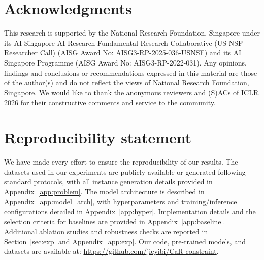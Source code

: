 \documentclass{article} %
\begin{document}
\section*{Acknowledgments}
This research is supported by the National Research Foundation, Singapore under its AI Singapore AI Research Fundamental Research Collaborative (US-NSF Researcher Call) (AISG Award No: AISG3-RP-2025-036-USNSF) and its AI Singapore Programme (AISG Award No: AISG3-RP-2022-031). Any opinions, findings and conclusions or recommendations expressed in this material are those of the author(s) and do not reflect the views of National Research Foundation, Singapore. We would like to thank the anonymous reviewers and (S)ACs of ICLR 2026 for their constructive comments and service to the community.
\section*{Reproducibility statement}
We have made every effort to ensure the reproducibility of our results. The datasets used in our experiments are publicly available or generated following standard protocols, with all instance generation details provided in Appendix~\ref{app:problem}. The model architecture is described in Appendix~\ref{app:model_arch}, with hyperparameters and training/inference configurations detailed in Appendix~\ref{app:hyper}. Implementation details and the selection criteria for baselines are provided in Appendix~\ref{app:baseline}. Additional ablation studies and robustness checks are reported in Section~\ref{sec:exp} and Appendix~\ref{app:exp}. {Our code, pre-trained models, and datasets are available at: \url{https://github.com/jieyibi/CaR-constraint}.}





\newpage
\appendix

\end{document}
